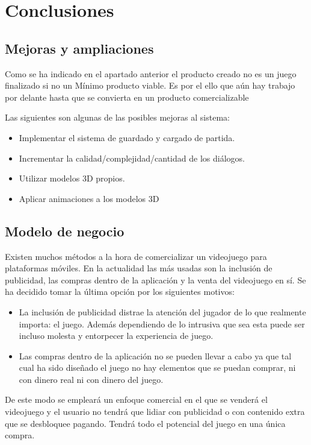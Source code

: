 \chapter{Conclusiones}

\section{Mejoras y ampliaciones}

Como se ha indicado en el apartado anterior el producto creado no es un juego finalizado si no un Mínimo producto viable. Es por el ello que aún hay trabajo por delante hasta que se convierta en un producto comercializable

Las siguientes son algunas de las posibles mejoras al sistema:

\begin{itemize}
	\item Implementar el sistema de guardado y cargado de partida.
	\item Incrementar la calidad/complejidad/cantidad de los diálogos.
	\item Utilizar modelos 3D propios.
	\item Aplicar animaciones a los modelos 3D
\end{itemize}

\section{Modelo de negocio}

Existen muchos métodos a la hora de comercializar un videojuego para plataformas móviles. En la actualidad las más usadas son la inclusión de publicidad, las compras dentro de la aplicación y la venta del videojuego en sí.
Se ha decidido tomar la última opción por los siguientes motivos: 

\begin{itemize}
	\item La inclusión de publicidad distrae la atención del jugador de lo que realmente importa: el juego. Además dependiendo de lo intrusiva que sea esta puede ser incluso molesta y entorpecer la experiencia de juego.
	\item Las compras dentro de la aplicación no se pueden llevar a cabo ya que tal cual ha sido diseñado el juego no hay elementos que se puedan comprar, ni con dinero real ni con dinero del juego.
\end{itemize}

De este modo se empleará un enfoque comercial en el que se venderá el videojuego y el usuario no tendrá que lidiar con publicidad o con contenido extra que se desbloquee pagando. Tendrá todo el potencial del juego en una única compra.

